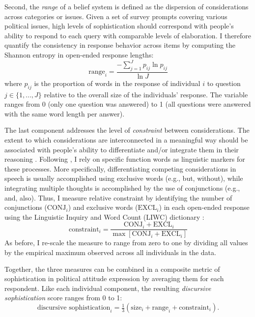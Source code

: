 Second, the \textit{range} of a belief system is defined as the dispersion of considerations across categories or issues. Given a set of survey prompts covering various political issues, high levels of sophistication should correspond with people's ability to respond to each query with comparable levels of elaboration. I therefore quantify the consistency in response behavior across items by computing the Shannon entropy in open-ended response lengths:
\begin{equation}
\text{range}_i = \dfrac{-\sum_{j=1}^J p_{ij} \ln p_{ij}}{\ln J}
\end{equation}
where $p_{ij}$ is the proportion of words in the response of individual $i$ to question $j\in \{1,...,J\}$ relative to the overall size of the individuals' response. The variable ranges from 0 (only one question was answered) to 1 (all questions were answered with the same word length per answer).

The last component addresses the level of \textit{constraint} between considerations. The extent to which considerations are interconnected in a meaningful way should be associated with people's ability to differentiate and/or integrate them in their reasoning \citep{tetlock1993cognitive}. Following \citet{tausczik2010psychological}, I rely on specific function words as linguistic markers for these processes. More specifically, differentiating competing considerations in speech is usually accomplished using exclusive words (e.g., but, without), while integrating multiple thoughts is accomplished by the use of conjunctions (e.g., and, also). Thus, I measure relative constraint by identifying the number of conjunctions ($\text{CONJ}_i$) and exclusive words ($\text{EXCL}_i$) in each open-ended response using the Linguistic Inquiry and Word Count (LIWC) dictionary \citep{pennebaker2015development}:
\begin{equation}
\text{constraint}_i = \dfrac{\text{CONJ}_i + \text{EXCL}_i}{\max\left[\text{CONJ}_i + \text{EXCL}_i\right]}
\end{equation}
As before, I re-scale the measure to range from zero to one by dividing all values by the empirical maximum observed across all individuals in the data.

Together, the three measures can be combined in a composite metric of sophistication in political attitude expression by averaging them for each respondent. Like each individual component, the resulting \textit{discursive sophistication} score ranges from 0 to 1:
\begin{equation}
\text{discursive sophistication}_i = \tfrac{1}{3}(\text{size}_i + \text{range}_i + \text{constraint}_i).
\end{equation}

